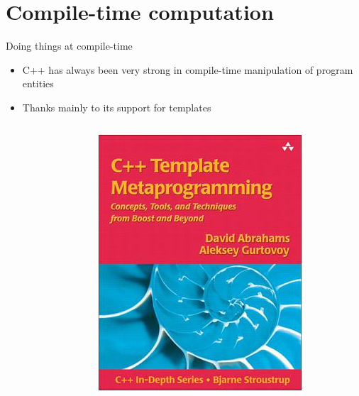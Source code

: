 
\section{Compile-time computation}

\begin{frame}{Doing things at compile-time}

  \begin{itemize}
  \item C++ has always been very strong in compile-time manipulation of program entities
  \item Thanks mainly to its support for templates
    \begin{columns}[T]
      \begin{column}{.1\textwidth}
      \end{column}
      \begin{column}{.2\textwidth}
        \includegraphics[width=\textwidth]{images/boost_mpl.jpeg}
      \end{column}

\end{columns}
\end{itemize}
\end{frame}
